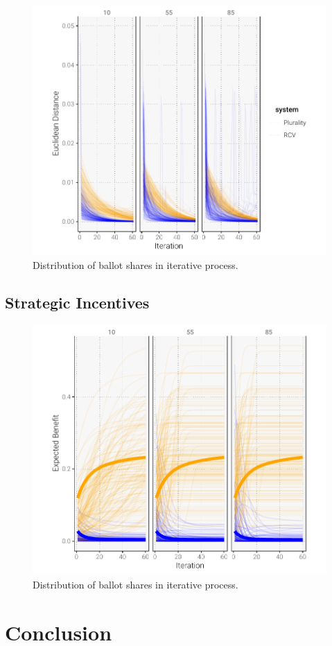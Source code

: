 \documentclass[12pt, letter]{article}
\begin{document}
\begin{figure}[]
	\centering
	\includegraphics[width = .7\textwidth]{../output/figures/euclidean}
	\caption{Distribution of ballot shares in iterative process.}
	\label{}
\end{figure}

\subsection{Strategic Incentives}

\begin{figure}[]
	\centering
	\includegraphics[width = .7\textwidth]{../output/figures/iterated_expbenefit}
	\caption{Distribution of ballot shares in iterative process.}
	\label{}
\end{figure}

\section{Conclusion}
\end{document}
